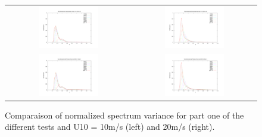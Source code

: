 \begin{figure}[h!]
\begin{tabular}{cc}
  \includegraphics[width=0.5\textwidth]{variance_ad_free_mesh_t3_v10.pdf} &
  \includegraphics[width=0.5\textwidth]{variance_ad_free_mesh_t3_v20.pdf}\\
  \includegraphics[width=0.5\textwidth]{variance_ad_free_mesh_t4_v10.pdf} &
  \includegraphics[width=0.5\textwidth]{variance_ad_free_mesh_t4_v20.pdf}\\
\end{tabular}
\caption{Comparaison of normalized spectrum variance for part one of the
  different tests and U10 = 10m/s (left) and 20m/s (right).}
\label{variancesfet1}
\end{figure} \begin{figure}[h!]

\end{figure}
